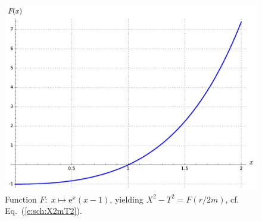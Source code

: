 \begin{figure}
\centerline{\includegraphics[height=0.37\textheight]{max_X2mT2.pdf}}
\caption[]{\label{f:max:X2mT2} \footnotesize
Function $F:\; x\mapsto \mathrm{e}^{x}(x-1)$, yielding
$X^2-T^2 = F(r/2m)$, cf. Eq.~(\ref{e:sch:X2mT2}).}
\end{figure}

